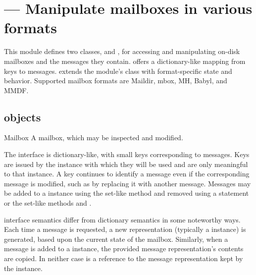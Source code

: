 \section{ ---
          Manipulate mailboxes in various formats}



This module defines two classes,  and , for
accessing and manipulating on-disk mailboxes and the messages they contain.
 offers a dictionary-like mapping from keys to messages.
 extends the  module's 
class with format-specific state and behavior. Supported mailbox formats are
Maildir, mbox, MH, Babyl, and MMDF.

\begin{seealso}
\end{seealso}

\subsection{ objects}
\label{mailbox-objects}

\begin{classdesc*}{Mailbox}
A mailbox, which may be inspected and modified.
\end{classdesc*}

The  interface is dictionary-like, with small keys
corresponding to messages. Keys are issued by the  instance
with which they will be used and are only meaningful to that 
instance. A key continues to identify a message even if the corresponding
message is modified, such as by replacing it with another message. Messages may
be added to a  instance using the set-like method
 and removed using a  statement or the set-like methods
 and .

 interface semantics differ from dictionary semantics in some
noteworthy ways. Each time a message is requested, a new representation
(typically a  instance) is generated, based upon the current
state of the mailbox. Similarly, when a message is added to a 
instance, the provided message representation's contents are copied. In neither
case is a reference to the message representation kept by the 
instance.


